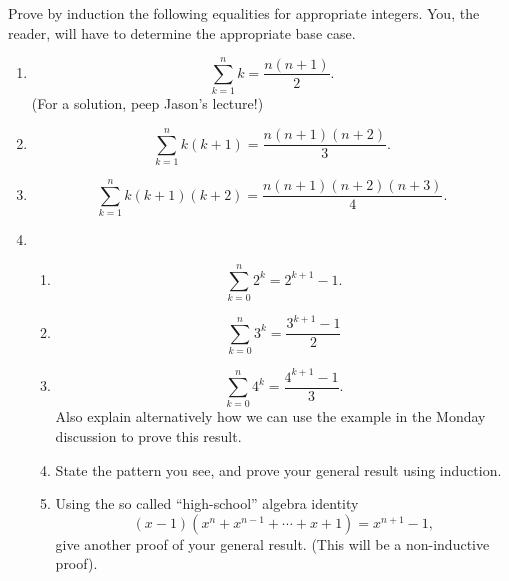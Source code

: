 Prove by induction the following equalities for appropriate integers. You, the reader, will have to determine the appropriate base case.
\begin{enumerate}
    \item \[\sum_{k = 1}^nk = \frac{n(n + 1)}{2}.\] (For a solution, peep Jason's lecture!)
    \item \[\sum_{k = 1}^nk(k + 1) = \frac{n(n + 1)(n + 2)}{3}.\]
    \item \[\sum_{k = 1}^nk(k + 1)(k + 2) = \frac{n(n + 1)(n + 2)(n + 3)}{4}.\]
    \item
    
    \begin{enumerate}
        \item \[\sum_{k = 0}^n2^k = 2^{k + 1} - 1.\]
        \item \[\sum_{k = 0}^n3^k = \frac{3^{k + 1} - 1}{2}\]
        \item \[\sum_{k = 0}^n4^k = \frac{4^{k + 1} - 1}{3}.\] Also explain alternatively how we can use the example in the Monday discussion to prove this result.
        \item State the pattern you see, and prove your general result using induction.
        \item Using the so called ``high-school'' algebra identity
        \[(x - 1)(x^n + x^{n-1} + \cdots + x + 1) = x^{n + 1} - 1,\] give another proof of your general result. (This will be a non-inductive proof).
    \end{enumerate}
\end{enumerate}
